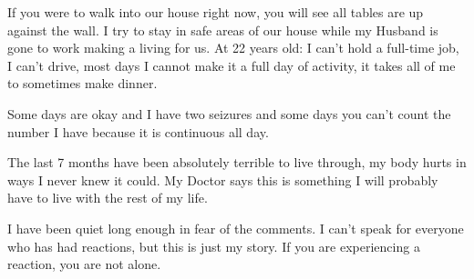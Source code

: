 If you were to walk into our house right now, you will see all tables are up
against the wall. I try to stay in safe areas of our house while my Husband is
gone to work making a living for us. At 22 years old: I can’t hold a full-time
job, I can’t drive, most days I cannot make it a full day of activity, it takes
all of me to sometimes make dinner.

Some days are okay and I have two seizures and some days you can’t count the
number I have because it is continuous all day.

The last 7 months have been absolutely terrible to live through, my body hurts
in ways I never knew it could. My Doctor says this is something I will probably
have to live with the rest of my life.

I have been quiet long enough in fear of the comments. I can’t speak for
everyone who has had reactions, but this is just my story. If you are
experiencing a reaction, you are not alone.


